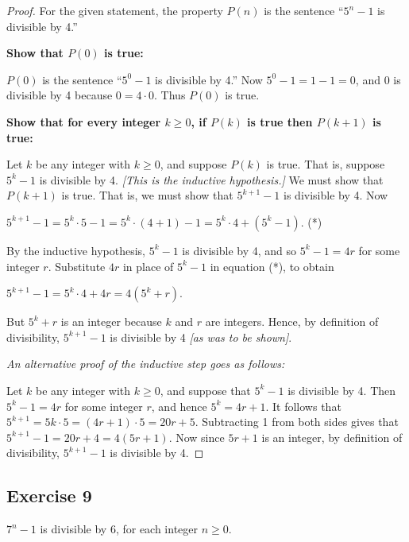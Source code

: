 \documentclass[14pt]{extarticle}
\begin{document}
\begin{proof}
    For the given statement, the property $P(n)$ is the sentence “$5^n - 1$ is divisible by 4.”

    {\bf Show that $P(0)$ is true:}

    $P(0)$ is the sentence “$5^0 - 1$ is divisible by 4.” Now $5^0 - 1 = 1 - 1 = 0$, and 0 is divisible by 4 because $0 = 4 \cdot 0$. Thus $P(0)$ is true.

        {\bf Show that for every integer $k \geq 0$, if $P(k)$ is true then $P(k + 1)$ is true:}

    Let $k$ be any integer with $k \geq 0$, and suppose $P(k)$ is true. That is, suppose $5^k - 1$ is divisible by 4. {\it [This is the inductive hypothesis.]} We must show that $P(k + 1)$ is true. That is, we must show that $5^{k + 1} - 1$ is divisible by 4. Now

    $5^{k + 1} - 1 = 5^k \cdot 5 - 1 = 5^k \cdot (4 + 1) - 1 = 5^k \cdot 4 + (5^k - 1)$. (*)

    By the inductive hypothesis, $5^k - 1$ is divisible by 4, and so $5^k - 1 = 4r$ for some integer $r$. Substitute $4r$ in place of $5^k - 1$ in equation (*), to obtain

    $5^{k + 1} - 1 = 5^k \cdot 4 + 4r = 4(5^k + r)$.

    But $5^k + r$ is an integer because $k$ and $r$ are integers. Hence, by definition of divisibility, $5^{k + 1} - 1$ is divisible by 4 {\it [as was to be shown]}.

    {\it An alternative proof of the inductive step goes as follows:}

    Let $k$ be any integer with $k \geq 0$, and suppose that $5^k - 1$ is divisible by 4. Then $5^k - 1 = 4r$ for some integer $r$, and hence $5^k = 4r + 1$. It follows that $5^{k + 1} = 5k \cdot 5 = (4r + 1) \cdot 5 = 20r + 5$. Subtracting 1 from both sides gives that $5^{k + 1} - 1 = 20r + 4 = 4(5r + 1)$. Now since $5r + 1$ is an integer, by definition of divisibility, $5^{k + 1} - 1$ is divisible by 4.
\end{proof}

\subsection{Exercise 9}
$7^n - 1$ is divisible by 6, for each integer $n \geq 0$.
\end{document}
